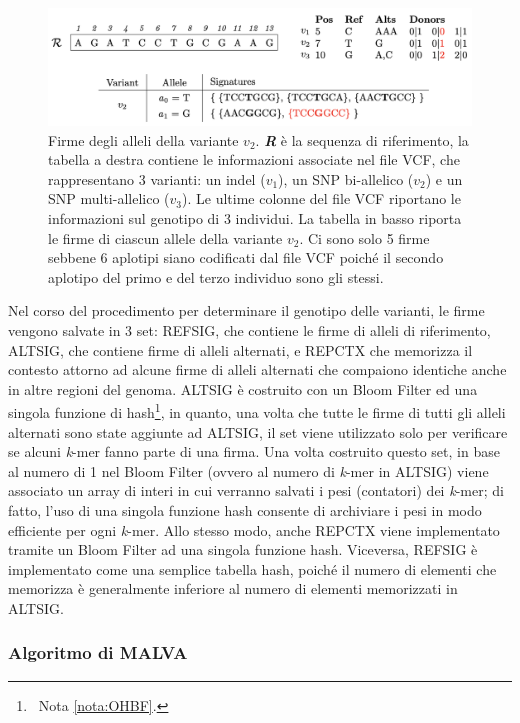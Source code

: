 \documentclass[../main.tex]{subfiles}
\begin{document}
 \begin{figure}[h!]
	\centering
  	\captionsetup{justification=justified}
 	\includegraphics[scale=.65]{images/malva-sign.png}
  	\caption{Firme degli alleli della variante $v_{2}$. \textit{\textbf{R}} è la sequenza di riferimento, la tabella a destra contiene le informazioni associate nel file VCF, che rappresentano 3 varianti: un indel ($v_{1}$), un SNP bi-allelico ($v_{2}$) e un SNP multi-allelico ($v_{3}$). Le ultime colonne del file VCF riportano le informazioni sul genotipo di 3 individui. La tabella in basso riporta le firme di ciascun allele della variante $v_{2}$. Ci sono solo 5 firme sebbene 6 aplotipi siano codificati dal file VCF poiché il secondo aplotipo del primo e del terzo individuo sono gli stessi.}
  	\label{fig:malvaSign}
\end{figure}


Nel corso del procedimento per determinare il genotipo delle varianti, le firme vengono salvate in 3 set: REFSIG, che contiene le firme di alleli di riferimento, ALTSIG, che contiene firme di alleli alternati, e REPCTX che memorizza il contesto attorno ad alcune firme di alleli alternati che compaiono identiche anche in altre regioni del genoma. ALTSIG è costruito con un Bloom Filter ed una singola funzione di hash\footnote{\ Nota \vref{nota:OHBF}.}, in quanto, una volta che tutte le firme di tutti gli alleli alternati sono state aggiunte ad ALTSIG, il set viene utilizzato solo per verificare se alcuni \textit{k}-mer fanno parte di una firma. Una volta costruito questo set, in base al numero di 1 nel Bloom Filter (ovvero al numero di \textit{k}-mer in ALTSIG) viene associato un array di interi in cui verranno salvati i pesi (contatori) dei \textit{k}-mer; di fatto, l'uso di una singola funzione hash consente di archiviare i pesi in modo efficiente per ogni \textit{k}-mer. Allo stesso modo, anche REPCTX viene implementato tramite un Bloom Filter ad una singola funzione hash. Viceversa, REFSIG è implementato come una semplice tabella hash, poiché il numero di elementi che memorizza è generalmente inferiore al numero di elementi memorizzati in ALTSIG. 


\subsubsection{Algoritmo di MALVA}
\end{document}
